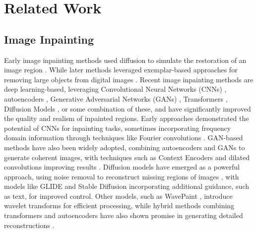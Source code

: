 \section{Related Work}
\label{sec:related}


\subsection{Image Inpainting}

Early image inpainting methods used diffusion to simulate the restoration of an image region \cite{bertalmio2000pdeinpainting, bertalmio2001pde2, bertalmio2005pde3, chan2001pde}. While later methods leveraged exemplar-based approaches for removing large objects from digital images \cite{criminisi2004patch, jin2015patch2, kawai2016patch3, guo2018patch4}. Recent image inpainting methods are deep learning-based, leveraging Convolutional Neural Networks (CNNs) \cite{lecun1997cnn}, autoencoders \cite{kramer1991autoencoder}, Generative Adversarial Networks (GANs) \cite{goodfellow2014generativeadversarialnetworks}, Transformers \cite{vaswani2017attentionneed}, Diffusion Models \cite{chang2023designfundamentalsdiffusionmodels}, or some combination of these, and have significantly improved the quality and realism of inpainted regions. Early approaches demonstrated the potential of CNNs for inpainting tasks, sometimes incorporating frequency domain information through techniques like Fourier convolutions \cite{suvorov2021lama}. GAN-based methods have also been widely adopted, combining autoencoders and GANs to generate coherent images, with techniques such as Context Encoders \cite{pathak2016context} and dilated convolutions improving results \cite{yu2018generativeimageinpaintingcontextual}. Diffusion models have emerged as a powerful approach, using noise removal to reconstruct missing regions of images \cite{lugmayr2022repaint}, with models like GLIDE \cite{nichol2022glidephotorealisticimagegeneration} and Stable Diffusion \cite{rombach2022stablediffusion} incorporating additional guidance, such as text, for improved control. Other models, such as WavePaint \cite{jeevan2023wavepaintresourceefficienttokenmixerselfsupervised}, introduce wavelet transforms for efficient processing, while hybrid methods combining transformers and autoencoders have also shown promise in generating detailed reconstructions \cite{esser2021taming}. 

